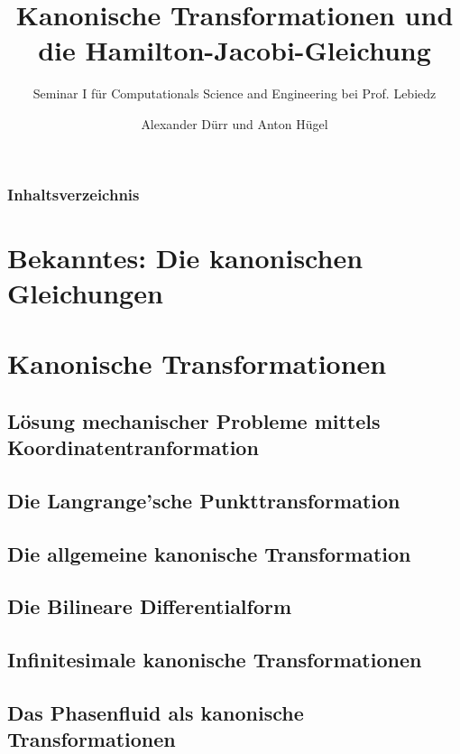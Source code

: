 \documentclass{beamer}
\title{Kanonische Transformationen und die Hamilton-Jacobi-Gleichung}
\subtitle{Seminar I für Computationals Science and Engineering bei Prof. Lebiedz}
\author{Alexander Dürr und Anton Hügel}
\institute
{\\Universität Ulm, Institut für Numerische Mathematik}
\begin{document}
\hspace*{-1.49cm}
\frame[plain]{\titlepage}

\hspace*{-0.7cm}
\begin{frame}
  \frametitle{Inhaltsverzeichnis}
  \tableofcontents
\end{frame}


\section{Bekanntes: Die kanonischen Gleichungen}

\section{Kanonische Transformationen}
    

    \subsection{Lösung mechanischer Probleme mittels Koordinatentranformation}
    
    
    \subsection{Die Langrange'sche Punkttransformation}
    
    
    \subsection{Die allgemeine kanonische Transformation}
    
    \subsection{Die Bilineare Differentialform}
    
    \subsection{Infinitesimale kanonische Transformationen}
    
    \subsection{Das Phasenfluid als kanonische Transformationen}
    
    
\end{document}
